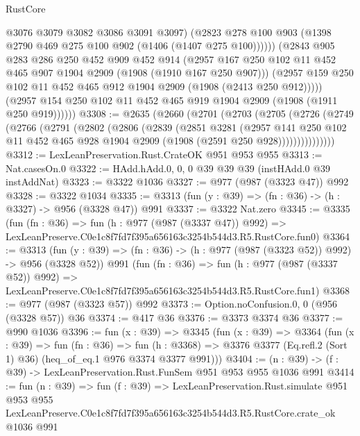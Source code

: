 \begin{lexlean}{RustCore}
\begin{coremodule}
                  @3076
                  @3079
                  @3082
                  @3086
                  @3091
                  @3097)
                (@2823 @278 @100 @903 (@1398 @2790 @469 @275 @100 @902 (@1406 (@1407 @275 @100))))))
            (@2843
              @905
              @283
              @286
              @250
              @452
              @909
              @452
              @914
              (@2957 @167 @250 @102 @11 @452 @465 @907 @1904 @2909 (@1908 (@1910 @167 @250 @907)))
              (@2957 @159 @250 @102 @11 @452 @465 @912 @1904 @2909 (@1908 (@2413 @250 @912)))))
          (@2957 @154 @250 @102 @11 @452 @465 @919 @1904 @2909 (@1908 (@1911 @250 @919))))))
@3308 := @2635
    (@2660
      (@2701
        (@2703
          (@2705
            (@2726
              (@2749
                (@2766
                  (@2791
                    (@2802
                      (@2806
                        (@2839
                          (@2851
                            @3281
                            (@2957
                              @141
                              @250
                              @102
                              @11
                              @452
                              @465
                              @928
                              @1904
                              @2909
                              (@1908 (@2591 @250 @928)))))))))))))))
@3312 := LexLeanPreservation.Rust.CrateOK @951 @953 @955
@3313 := Nat.casesOn.{0}
@3322 := HAdd.hAdd.{0, 0, 0} @39 @39 @39 (instHAdd.{0} @39 instAddNat)
@3323 := @3322 @1036
@3327 := @977 (@987 (@3323 @47)) @992
@3328 := @3322 @1034
@3335 := @3313 (fun (y : @39) => (fn : @36) -> (h : @3327) -> @956 (@3328 @47)) @991
@3337 := @3322 Nat.zero
@3345 := @3335
    (fun (fn : @36) =>
    fun (h : @977 (@987 (@3337 @47)) @992) =>
    LexLeanPreserve.C0e1c8f7fd7f395a656163c3254b544d3.R5.RustCore.fun0)
@3364 := @3313
    (fun (y : @39) => (fn : @36) -> (h : @977 (@987 (@3323 @52)) @992) -> @956 (@3328 @52))
    @991
    (fun (fn : @36) =>
    fun (h : @977 (@987 (@3337 @52)) @992) =>
    LexLeanPreserve.C0e1c8f7fd7f395a656163c3254b544d3.R5.RustCore.fun1)
@3368 := @977 (@987 (@3323 @57)) @992
@3373 := Option.noConfusion.{0, 0} (@956 (@3328 @57)) @36
@3374 := @417 @36
@3376 := @3373 @3374 @36
@3377 := @990 @1036
@3396 := fun (x : @39) =>
  @3345
    (fun (x : @39) =>
    @3364
      (fun (x : @39) =>
      fun (fn : @36) =>
      fun (h : @3368) =>
      @3376 @3377 (Eq.refl.{2} (Sort 1) @36) (heq_of_eq.{1} @976 @3374 @3377 @991)))
@3404 := (n : @39) -> (f : @39) -> LexLeanPreservation.Rust.FunSem @951 @953 @955 @1036 @991
@3414 := fun (n : @39) =>
  fun (f : @39) =>
  LexLeanPreservation.Rust.simulate
    @951
    @953
    @955
    LexLeanPreserve.C0e1c8f7fd7f395a656163c3254b544d3.R5.RustCore.crate_ok
    @1036
    @991
\end{coremodule}
\end{lexlean}
